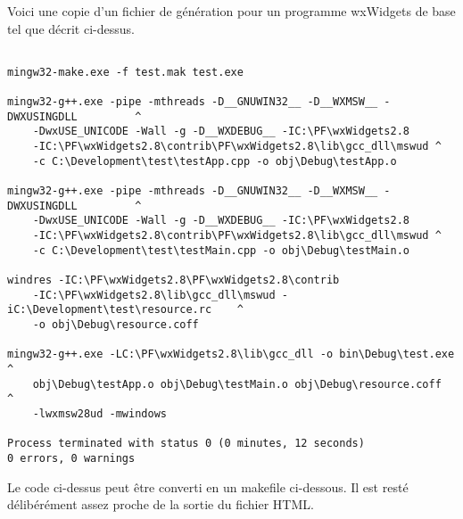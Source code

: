 Voici une copie d'un fichier de génération pour un programme wxWidgets de base tel que décrit ci-dessus.



\begin{verbatim}

mingw32-make.exe -f test.mak test.exe

mingw32-g++.exe -pipe -mthreads -D__GNUWIN32__ -D__WXMSW__ -DWXUSINGDLL         ^
    -DwxUSE_UNICODE -Wall -g -D__WXDEBUG__ -IC:\PF\wxWidgets2.8
    -IC:\PF\wxWidgets2.8\contrib\PF\wxWidgets2.8\lib\gcc_dll\mswud ^ 
    -c C:\Development\test\testApp.cpp -o obj\Debug\testApp.o

mingw32-g++.exe -pipe -mthreads -D__GNUWIN32__ -D__WXMSW__ -DWXUSINGDLL         ^
    -DwxUSE_UNICODE -Wall -g -D__WXDEBUG__ -IC:\PF\wxWidgets2.8
    -IC:\PF\wxWidgets2.8\contrib\PF\wxWidgets2.8\lib\gcc_dll\mswud ^ 
    -c C:\Development\test\testMain.cpp -o obj\Debug\testMain.o

windres -IC:\PF\wxWidgets2.8\PF\wxWidgets2.8\contrib
    -IC:\PF\wxWidgets2.8\lib\gcc_dll\mswud -iC:\Development\test\resource.rc    ^ 
    -o obj\Debug\resource.coff

mingw32-g++.exe -LC:\PF\wxWidgets2.8\lib\gcc_dll -o bin\Debug\test.exe          ^
    obj\Debug\testApp.o obj\Debug\testMain.o obj\Debug\resource.coff            ^
    -lwxmsw28ud -mwindows

Process terminated with status 0 (0 minutes, 12 seconds)
0 errors, 0 warnings
\end{verbatim}

Le code ci-dessus peut être converti en un makefile ci-dessous. Il est resté délibérément assez proche de la sortie du fichier HTML.

